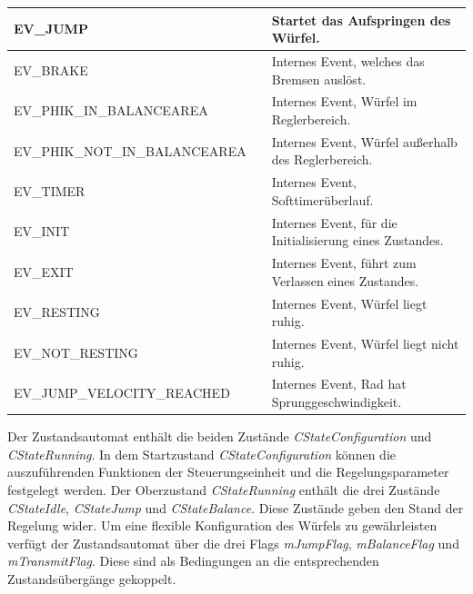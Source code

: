 \documentclass{article}
\begin{document}
\begin{table}[h]
\begin{tabular}{|>{\small}l|>{\small}l|>{\small}l|}
EV\_JUMP                       &                    & Startet das Aufspringen des Würfel.                      \\ \hline
EV\_BRAKE                      &                    & Internes Event, welches das Bremsen auslöst.             \\ \hline
EV\_PHIK\_IN\_BALANCEAREA      &                    & Internes Event, Würfel im Reglerbereich.                 \\ \hline
EV\_PHIK\_NOT\_IN\_BALANCEAREA &                    & Internes Event, Würfel außerhalb des Reglerbereich.      \\ \hline
EV\_TIMER                      &                    & Internes Event, Softtimerüberlauf.                       \\ \hline
EV\_INIT                       &                    & Internes Event, für die Initialisierung eines Zustandes. \\ \hline
EV\_EXIT                       &                    & Internes Event, führt zum Verlassen eines Zustandes.     \\ \hline
EV\_RESTING                    &                    & Internes Event, Würfel liegt ruhig.                      \\ \hline
EV\_NOT\_RESTING               &                    & Internes Event, Würfel liegt nicht ruhig.                \\ \hline
EV\_JUMP\_VELOCITY\_REACHED    &                    & Internes Event, Rad hat Sprunggeschwindigkeit.           \\ \hline
\end{tabular}
\end{table}


Der Zustandsautomat enthält die beiden Zustände \textit{CStateConfiguration} und \textit{CStateRunning}. In dem Startzustand \textit{CStateConfiguration} können die auszuführenden Funktionen der Steuerungseinheit und die Regelungsparameter festgelegt werden. Der Oberzustand \textit{CStateRunning} enthält die drei Zustände \textit{CStateIdle}, \textit{CStateJump} und \textit{CStateBalance}. Diese Zustände geben den Stand der Regelung wider. Um eine flexible Konfiguration des Würfels zu gewährleisten verfügt der Zustandsautomat über die drei Flags \textit{mJumpFlag}, \textit{mBalanceFlag} und \textit{mTransmitFlag}. Diese sind als Bedingungen an die entsprechenden Zustandsübergänge gekoppelt.
\end{document}
